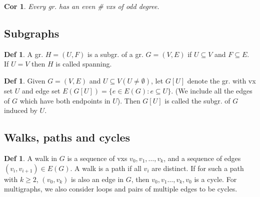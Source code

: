 \documentclass[11pt, fleqn, a4paper, landscape]{article}
\theoremstyle{plain} %
\newtheorem{cor}[thm]{Cor}
\theoremstyle{remark} %
\theoremstyle{definition} %
\newtheorem{defi}[thm]{Def}
\begin{document}
\begin{multicols}{5}
\begin{cor}
Every gr. has an even \# vxs of odd degree.
\end{cor}

\subsection{Subgraphs}

\begin{defi}
A gr. $H = (U, F)$ is a subgr. of a gr. $G = (V,E)$ if $U \subseteq V$ and $F \subseteq E$. If $U = V$ then $H$ is called spanning.
\end{defi}

\begin{defi}
Given $G = (V,E)$ and $U\subseteq  V (U \ne \emptyset)$, let $G[U]$ denote the gr. with vx set $U$ and edge set $E(G[U]) = \{e \in E(G) : e \subseteq U\}$. (We include all the edges of $G$ which have both
endpoints in $U$). Then $G[U]$ is called the subgr. of $G$ induced by $U$.
\end{defi}
\addtocounter{thm}{1}
\addtocounter{subsection}{1} 

\addtocounter{thm}{1}
\addtocounter{thm}{1}
\subsection{Walks, paths and cycles}

\begin{defi}
A walk in $G$ is a sequence of vxs $v_0, v_1, \dots , v_k$, and a sequence of edges $(v_i, v_{i+1}) \in E(G)$. A walk is a path if all $v_i$ are distinct. If for such a path with $k \ge 2$, $(v_0, v_k)$ is also
an edge in $G$, then $v_0, v_1 \dots , v_k, v_0$ is a cycle. For multigraphs, we also consider loops and pairs of multiple edges to be cycles.
\end{defi}


\end{multicols}
\end{document}
